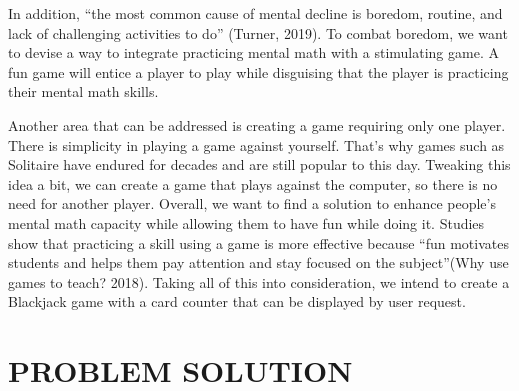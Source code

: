 \documentclass[12pt]{article}
\begin{document}
In addition, “the most common cause of mental decline is boredom, routine, and lack of challenging activities to do” (Turner, 2019). To combat boredom, we want to devise a way to integrate practicing mental math with a stimulating game. A fun game will entice a player to play while disguising that the player is practicing their mental math skills. 

Another area that can be addressed is creating a game requiring only one player. There is simplicity in playing a game against yourself. That's why games such as Solitaire have endured for decades and are still popular to this day. Tweaking this idea a bit, we can create a game that plays against the computer, so there is no need for another player. 
Overall, we want to find a solution to enhance people's mental math capacity while allowing them to have fun while doing it. Studies show that practicing a skill using a game is more effective because “fun motivates students and helps them pay attention and stay focused on the subject”(Why use games to teach? 2018). Taking all of this into consideration, we intend to create a Blackjack game with a card counter that can be displayed by user request.

\section{PROBLEM SOLUTION}


  
\end{document}
